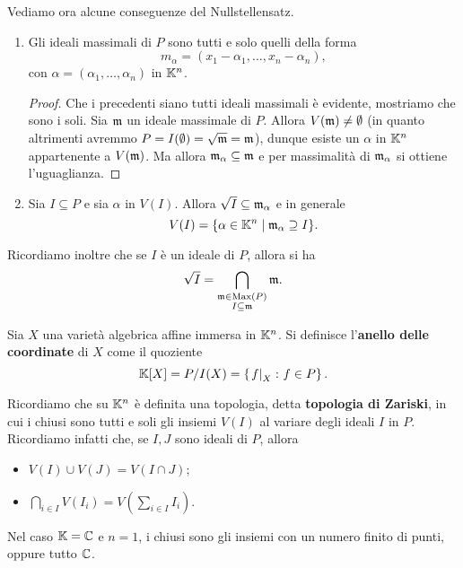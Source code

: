 \medskip 
\noindent
Vediamo ora alcune conseguenze del Nullstellensatz.
\setlength{\leftmargini}{0cm}
\begin{enumerate}
\item Gli ideali massimali di $P$ sono tutti e solo quelli della forma 
\[m_\alpha=(x_1-\alpha_1,\dots,x_n-\alpha_n),\] 
con $\alpha=(\alpha_1,\dots,\alpha_n)$ in $\mathbb{K}^n$.
\begin{proof}
    Che i precedenti siano tutti ideali massimali è evidente, mostriamo che sono i soli. Sia $\mathfrak{m}$ un ideale massimale di $P$. Allora $V(\mathfrak{m})\ne\emptyset$ (in quanto altrimenti avremmo $P=I(\emptyset)=\sqrt{\mathfrak{m}}=\mathfrak{m}$), dunque esiste un $\alpha$ in $\mathbb{K}^n$ appartenente a $V(\mathfrak{m})$. Ma allora $\mathfrak{m}_\alpha\subseteq \mathfrak{m}$ e per massimalità di $\mathfrak{m}_\alpha$ si ottiene l'uguaglianza. 
\end{proof}
\item Sia $I\subseteq P$ e sia $\alpha$ in $V(I)$. Allora $\sqrt{I}\subseteq \mathfrak{m}_\alpha$ e in generale \[V(I)=\{\alpha\in \mathbb{K}^n \mid \mathfrak{m}_\alpha \supseteq I\}.\]    
\end{enumerate}
\setlength{\leftmargini}{0.5cm}
Ricordiamo inoltre che se $I$ è un ideale di $P$, allora si ha 
\[\sqrt{I}=\bigcap_{\substack{\mathfrak{m} \in \operatorname{Max}(P) \\ I\subseteq \mathfrak{m}}} \mathfrak{m} .\]


\begin{definition}
    Sia $X$ una varietà algebrica affine immersa in $\mathbb{K}^n$. Si definisce l'\textbf{anello delle coordinate} di $X$ come il quoziente \[\mathbb{K}[X]= P/I(X)=\left\{\left.f\right|_{X} \colon f\in P\right\}.\] %
\end{definition}

Ricordiamo che su $\mathbb{K}^n$ è definita una topologia, detta \textbf{topologia di Zariski}, in cui i chiusi sono tutti e soli gli insiemi $V(I)$ al variare degli ideali $I$ in $P$. Ricordiamo infatti che, se $I,J$ sono ideali di $P$, allora \begin{itemize}
    \item $V(I)\cup V(J)=V(I\cap J)$;
    \item $\bigcap_{i\in I} V(I_i)=V\left(\sum_{i\in I}I_i\right)$.
\end{itemize}

\begin{example}
    Nel caso $\mathbb{K}=\mathbb{C}$ e $n=1$, i chiusi sono gli insiemi con un numero finito di punti, oppure tutto $\mathbb{C}$.
\end{example}

